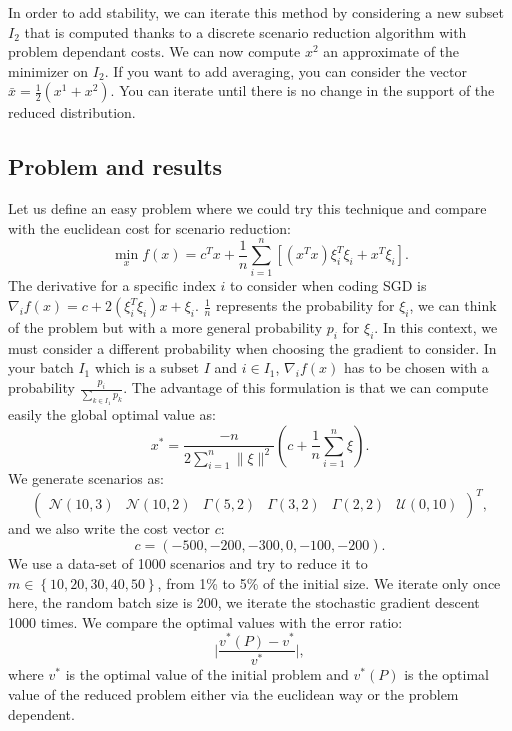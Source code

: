 \documentclass{amsart}
\begin{document}
In order to add stability, we can iterate this method by considering a new subset $I_2$ that is computed thanks to a discrete scenario reduction algorithm with problem dependant costs. We can now compute $x^2$ an approximate of the minimizer on $I_2$. If you want to add averaging, you can consider the vector $\bar{x}=\frac{1}{2}\left(x^1+x^2\right)$. You can iterate until there is no change in the support of the reduced distribution.
\subsection{Problem and results}
Let us define an easy problem where we could try this technique and compare with the euclidean cost for scenario reduction:
$$
    \min_{x}f\left(x\right)=c^Tx +\frac{1}{n}\sum_{i=1}^n \left[\left(x^Tx\right)\xi_i^T\xi_i+x^T\xi_i\right].
$$
The derivative for a specific index $i$ to consider when coding SGD is $\nabla_i f\left(x\right)= c+2\left(\xi_i^T\xi_i\right)x+\xi_i$. $\frac{1}{n}$ represents the probability for $\xi_i$, we can think of the problem but with a more general probability $p_i$ for $\xi_i$. In this context, we must consider a different probability when choosing the gradient to consider. In your batch $I_1$ which is a subset $I$ and $i\in I_1$, $\nabla_if\left(x\right)$ has to be chosen with a probability $\frac{p_i}{\sum_{k\in I_1}p_k}$. The advantage of this formulation is that we can compute easily the global optimal value as:
$$    
x^*=\frac{-n}{2\sum_{i=1}^n\lVert\xi\rVert^2}\left(c + \frac{1}{n}\sum_{i=1}^n\xi\right).
$$
We generate scenarios as:
$$
\begin{pmatrix}
    \mathcal{N}\left(10,3\right) & \mathcal{N}\left(10,2\right) & \Gamma\left(5,2\right) & \Gamma\left(3,2\right) &\Gamma\left(2,2\right) & \mathcal{U}\left(0,10\right)
\end{pmatrix}^T,
$$
and we also write the cost vector $c$:
$$
c=\left(-500,-200,-300,0,-100,-200\right).
$$
We use a data-set of 1000 scenarios and try to reduce it to $m\in\left\{10,20,30,40,50\right\}$, from 1\% to 5\% of the initial size. We iterate only once here, the random batch size is 200, we iterate the stochastic gradient descent 1000 times. We compare the optimal values with the error ratio:
$$
\lvert\frac{ v^*\left(P\right)-v^*}{v^*}\rvert,
$$
where $v^*$ is the optimal value of the initial problem and $v^*\left(P\right)$ is the optimal value of the reduced problem either via the euclidean way or the problem dependent. 
\clearpage
\end{document}
